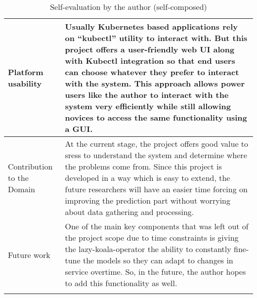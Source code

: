 \begin{longtable}{|p{33mm}|p{120mm}|}
  Platform usability &
    Usually Kubernetes based applications rely on “kubectl” utility to interact with. But this project offers a user-friendly web UI along with Kubectl integration so that end users can choose whatever they prefer to interact with the system. This approach allows power users like the author to interact with the system very efficiently while still allowing novices to access the same functionality using a GUI. \\ \hline
  Contribution to the Domain &
    At the current stage, the project offers good value to \acp{sres} to understand the system and determine where the problems come from. Since this project is developed in a way which is easy to extend, the future researchers will have an easier time forcing on improving the prediction part without worrying about data gathering and processing. \\ \hline
  Future work &
    One of the main key components that was left out of the project scope due to time constraints is giving the \ac{lazy-koala-operator} the ability to constantly fine-tune the models so they can adapt to changes in service overtime. So, in the future, the author hopes to add this functionality as well. \\ \hline
  
    \caption{Self-evaluation by the author (self-composed)}
\end{longtable}